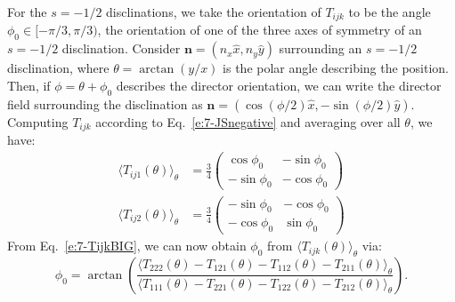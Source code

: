 For the $s = -1/2$ disclinations, we take the orientation of $T_{ijk}$ to be the angle $\phi_0 \in [-\pi/3,\pi/3)$, the orientation of one of the three axes of symmetry of an $s = -1/2$ disclination.
Consider $\mathbf{n} = (n_x \hat{x}, n_y \hat{y})$ surrounding an $s = -1/2$ disclination, where $\theta = \arctan (y/x)$ is the polar angle describing the position.
Then, if $\phi = \theta + \phi_0$ describes the director orientation, we can write the director field surrounding the disclination as $\mathbf{n} = (\cos(\phi/2)\hat{x},-\sin(\phi/2)\hat{y})$.
Computing $T_{ijk}$ according to Eq.~\ref{e:7-JSnegative} and averaging over all $\theta$, we have:
 \begin{align}
   \langle T_{ij1}(\theta) \rangle_{\theta} &=
        \frac{3}{4}\begin{pmatrix}
          \cos \phi_0 & -\sin \phi_0 \\
          -\sin \phi_0 & -\cos \phi_0
        \end{pmatrix}\nonumber \\
  \langle T_{ij2}(\theta) \rangle_{\theta} &=
       \frac{3}{4}\begin{pmatrix}
         -\sin \phi_0 & -\cos \phi_0 \\
         -\cos \phi_0 & \sin \phi_0
       \end{pmatrix}\label{e:7-TijkBIG}
 \end{align}
From Eq.~\ref{e:7-TijkBIG}, we can now obtain $\phi_0$ from $\langle T_{ijk}(\theta) \rangle_{\theta}$ via:
\begin{equation}\label{e:7-phi0Calc}
  \phi_0 = \arctan \left ( \frac{\langle T_{222}(\theta) - T_{121}(\theta) - T_{112}(\theta) - T_{211}(\theta)  \rangle_{\theta}} {\langle T_{111}(\theta) - T_{221}(\theta) - T_{122}(\theta) - T_{212}(\theta)  \rangle_{\theta}} \right).
\end{equation}


